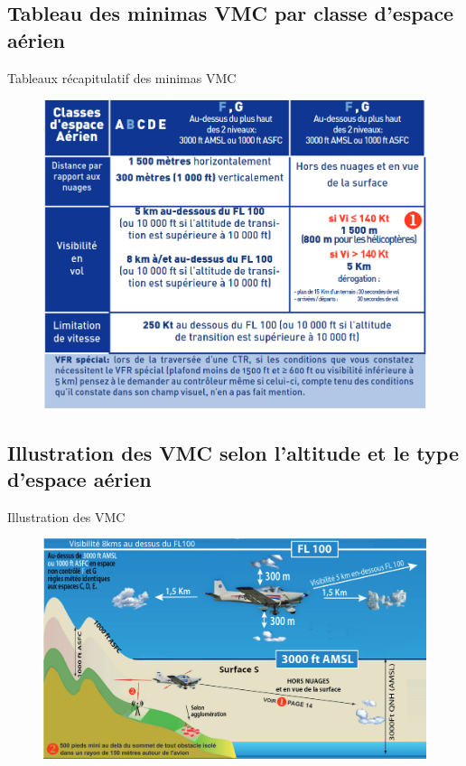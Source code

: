 \documentclass{beamer}
\begin{document}
\subsection{Tableau des minimas VMC par classe d'espace aérien}
\begin{frame}{Tableaux récapitulatif des minimas VMC}
  \begin{figure}
    \centering
    \includegraphics[scale=1]{images/conditions-vmc.png}
  \end{figure}
  
\end{frame}

\subsection{Illustration des VMC selon l'altitude et le type d'espace aérien}
\begin{frame}{Illustration des VMC}
  \begin{figure}
    \centering
    \includegraphics[scale=0.9]{images/conditions-vmc-graphique.png}
  \end{figure}
  
\end{frame}
\end{document}
